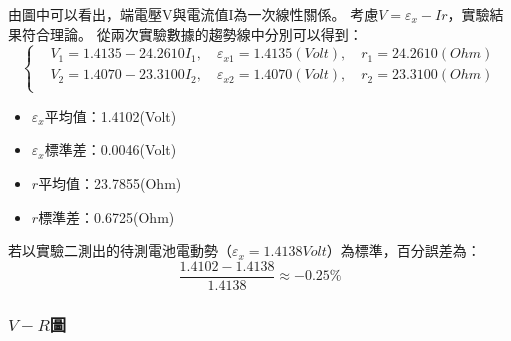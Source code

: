 \documentclass[12pt]{article}
\begin{document}
                由圖中可以看出，端電壓V與電流值I為一次線性關係。
                考慮$V=\varepsilon_x-Ir$，實驗結果符合理論。
                從兩次實驗數據的趨勢線中分別可以得到：
                $$
                \begin{cases}
                    &V_{1}=1.4135-24.2610I_1, \quad \varepsilon_{x1}=1.4135(Volt),\quad r_1=24.2610(Ohm)\\
                    &V_{2}=1.4070-23.3100I_2, \quad \varepsilon_{x2}=1.4070(Volt),\quad r_2=23.3100(Ohm)\\
                \end{cases}
                $$
                \begin{itemize}
                    \item $\varepsilon_x$平均值：1.4102(Volt)
                    \item $\varepsilon_x$標準差：0.0046(Volt)
                    \item $r$平均值：23.7855(Ohm)
                    \item $r$標準差：0.6725(Ohm)
                \end{itemize}
                若以實驗二測出的待測電池電動勢（$\varepsilon_x=1.4138Volt$）為標準，百分誤差為：
                $$\frac{1.4102-1.4138}{1.4138}\approx -0.25\%$$

                \subsubsection{$V-R$圖}
                    
\end{document}
